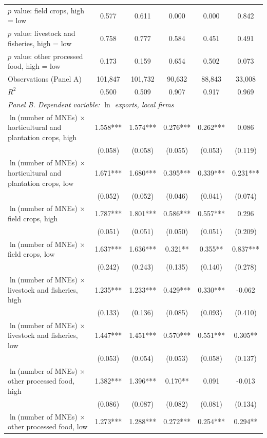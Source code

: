 \begin{tabular}{l*{5}{c}}
$p$ value: field crops, high = low & 0.577 & 0.611 & 0.000 & 0.000 & 0.842 \\
$p$ value: livestock and fisheries, high = low & 0.758 & 0.777 & 0.584 & 0.451 & 0.491 \\
$p$ value: other processed food, high = low & 0.173 & 0.159 & 0.654 & 0.502 & 0.073 \\
Observations (Panel A) & 101,847 & 101,732 & 90,632 & 88,843 & 33,008 \\
$R^2$ & 0.500 & 0.509 & 0.907 & 0.917 & 0.969 \\
\midrule
\multicolumn{6}{l}{\textit{Panel B. Dependent variable: $\ln$ exports, local firms}} \\
$\ln$(number of MNEs) $\times$ horticultural and plantation crops, high & 1.558*** & 1.574*** & 0.276*** & 0.262*** & 0.086 \\
 & (0.058) & (0.058) & (0.055) & (0.053) & (0.119) \\
$\ln$(number of MNEs) $\times$ horticultural and plantation crops, low & 1.671*** & 1.680*** & 0.395*** & 0.339*** & 0.231*** \\
 & (0.052) & (0.052) & (0.046) & (0.041) & (0.074) \\
$\ln$(number of MNEs) $\times$ field crops, high & 1.787*** & 1.801*** & 0.586*** & 0.557*** & 0.296 \\
 & (0.051) & (0.051) & (0.050) & (0.051) & (0.209) \\
$\ln$(number of MNEs) $\times$ field crops, low & 1.637*** & 1.636*** & 0.321** & 0.355** & 0.837*** \\
 & (0.242) & (0.243) & (0.135) & (0.140) & (0.278) \\
$\ln$(number of MNEs) $\times$ livestock and fisheries, high & 1.235*** & 1.233*** & 0.429*** & 0.330*** & -0.062 \\
 & (0.133) & (0.136) & (0.085) & (0.093) & (0.410) \\
$\ln$(number of MNEs) $\times$ livestock and fisheries, low & 1.447*** & 1.451*** & 0.570*** & 0.551*** & 0.305** \\
 & (0.053) & (0.054) & (0.053) & (0.058) & (0.137) \\
$\ln$(number of MNEs) $\times$ other processed food, high & 1.382*** & 1.396*** & 0.170** & 0.091 & -0.013 \\
 & (0.086) & (0.087) & (0.082) & (0.081) & (0.134) \\
$\ln$(number of MNEs) $\times$ other processed food, low & 1.273*** & 1.288*** & 0.272*** & 0.254*** & 0.294** \\

\end{tabular}
